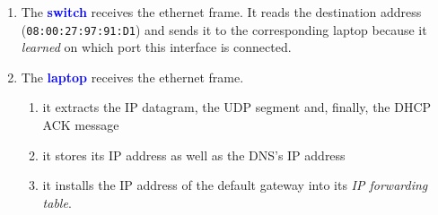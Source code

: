 \documentclass[a4paper]{article}
\begin{document}
\begin{enumerate}
\begin{center}
\end{center}



    \item The \textcolor{blue}{\textbf{switch}} receives the ethernet frame. It reads the destination address (\texttt{08:00:27:97:91:D1}) and sends it to the corresponding laptop because it \textit{learned} on which port this interface is connected.
    \item The \textcolor{blue}{\textbf{laptop}} receives the ethernet frame.
    \begin{enumerate}
        \item it extracts the IP datagram, the UDP segment and, finally, the DHCP ACK message
        \item it stores its IP address as well as the DNS's IP address
        \item it installs the IP address of the default gateway into its \textit{IP forwarding table}.
    \end{enumerate}
\end{enumerate}
\end{document}
